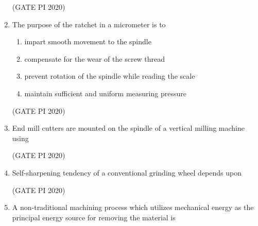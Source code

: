 \documentclass[journal,12pt,onecolumn]{IEEEtran}
\theoremstyle{remark}
\begin{document}
\begin{enumerate}
\hfill (GATE PI 2020)

\item The purpose of the ratchet in a micrometer is to

\begin{enumerate}
\item impart smooth movement to the spindle
\item compensate for the wear of the screw thread
\item prevent rotation of the spindle while reading the scale
\item maintain sufficient and uniform measuring pressure
\end{enumerate}

\hfill (GATE PI 2020)

\item End mill cutters are mounted on the spindle of a vertical milling machine using
\begin{enumerate}
\end{enumerate}

\hfill (GATE PI 2020)

\item Self-sharpening tendency of a conventional grinding wheel depends upon
\begin{enumerate}
\end{enumerate}

\hfill (GATE PI 2020)

\item A non-traditional machining process which utilizes mechanical energy as the principal energy source for removing the material is
\begin{enumerate}
\end{enumerate}


\end{enumerate}
\end{document}

